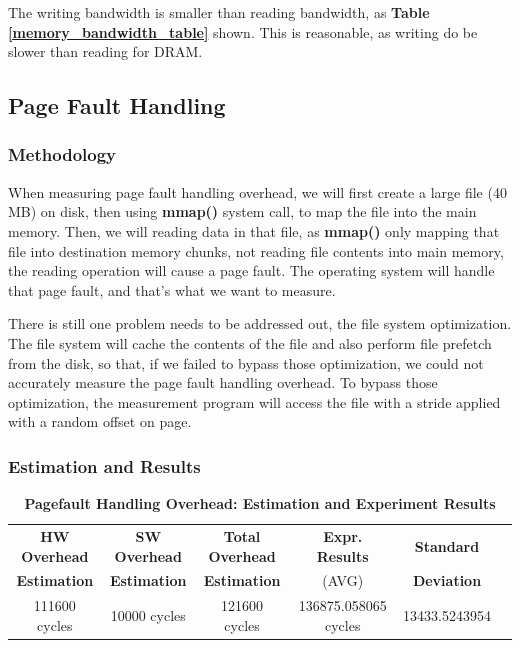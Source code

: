 The writing bandwidth is smaller than reading bandwidth, as \textbf{Table \ref{memory_bandwidth_table}} shown. This is reasonable, as writing do be slower than reading for DRAM.

\subsection{Page Fault Handling}

\subsubsection{Methodology}

When measuring page fault handling overhead, we will first create a large file (40 MB) on disk, then using \textbf{mmap()} system call, to map the file into the main memory. Then, we will reading data in that file, as \textbf{mmap()} only mapping that file into destination memory chunks, not reading file contents into main memory, the reading operation will cause a page fault. The operating system will handle that page fault, and that's what we want to measure.

There is still one problem needs to be addressed out, the file system optimization. The file system will cache the contents of the file and also perform file prefetch from the disk, so that, if we failed to bypass those optimization, we could not accurately measure the page fault handling overhead. To bypass those optimization, the measurement program will access the file with a stride applied with a random offset on page.

\subsubsection{Estimation and Results}

\begin{table}[ht]
  \centering
  \caption{\textbf{Pagefault Handling Overhead: Estimation and Experiment Results}}
  \begin{threeparttable}
  \begin{tabular}{cccccc}
  \hline
        \textbf{HW Overhead} & \textbf{SW Overhead } & \textbf{Total Overhead} & \textbf{Expr. Results} & \textbf{Standard}\\
        \textbf{Estimation}       &  \textbf{Estimation}         & \textbf{Estimation}  & (AVG)   & \textbf{Deviation} \\
  \hline
        111600 cycles & 10000 cycles & 121600 cycles  & 136875.058065 cycles & 13433.5243954 \\
  \hline
  \end{tabular}
  \end{threeparttable}
  \label{pagefault_handle_time}
\end{table}

